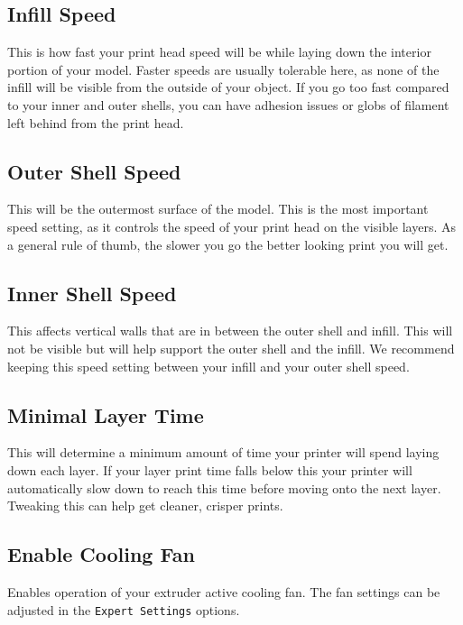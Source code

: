 \subsection{Infill Speed}
This is how fast your print head speed will be while laying down the interior portion of your model. Faster speeds are usually tolerable here, as none of the infill will be visible from the outside of your object. If you go too fast compared to your inner and outer shells, you can have adhesion issues or globs of filament left behind from the print head.

\subsection{Outer Shell Speed}
This will be the outermost surface of the model. This is the most important speed setting, as it controls the speed of your print head on the visible layers. As a general rule of thumb, the slower you go the better looking print you will get. 

\subsection{Inner Shell Speed}
This affects vertical walls that are in between the outer shell and infill. This will not be visible but will help support the outer shell and the infill. We recommend keeping this speed setting between your infill and your outer shell speed.

\subsection{Minimal Layer Time}
This will determine a minimum amount of time your printer will spend laying down each layer. If your layer print time falls below this your printer will automatically slow down to reach this time before moving onto the next layer. Tweaking this can help get cleaner, crisper prints.

\subsection{Enable Cooling Fan}
Enables operation of your extruder active cooling fan. The fan settings can be adjusted in the \texttt{Expert Settings} options.

